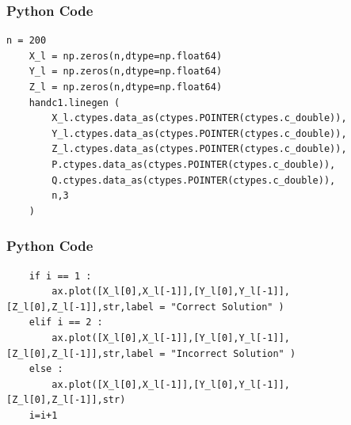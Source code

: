 \documentclass{beamer}
\begin{document}
\begin{frame}[fragile]
    \frametitle{Python Code}
    \begin{lstlisting}
n = 200
    X_l = np.zeros(n,dtype=np.float64)
    Y_l = np.zeros(n,dtype=np.float64)
    Z_l = np.zeros(n,dtype=np.float64)
    handc1.linegen (
        X_l.ctypes.data_as(ctypes.POINTER(ctypes.c_double)),
        Y_l.ctypes.data_as(ctypes.POINTER(ctypes.c_double)),
        Z_l.ctypes.data_as(ctypes.POINTER(ctypes.c_double)),
        P.ctypes.data_as(ctypes.POINTER(ctypes.c_double)),
        Q.ctypes.data_as(ctypes.POINTER(ctypes.c_double)),
        n,3
    )
\end{lstlisting}
\end{frame}
\begin{frame}[fragile]
    \frametitle{Python Code}
    \begin{lstlisting}
    if i == 1 :
        ax.plot([X_l[0],X_l[-1]],[Y_l[0],Y_l[-1]],[Z_l[0],Z_l[-1]],str,label = "Correct Solution" )
    elif i == 2 : 
        ax.plot([X_l[0],X_l[-1]],[Y_l[0],Y_l[-1]],[Z_l[0],Z_l[-1]],str,label = "Incorrect Solution" )
    else :
        ax.plot([X_l[0],X_l[-1]],[Y_l[0],Y_l[-1]],[Z_l[0],Z_l[-1]],str)
    i=i+1
\end{lstlisting}
\end{frame}
\end{document}
